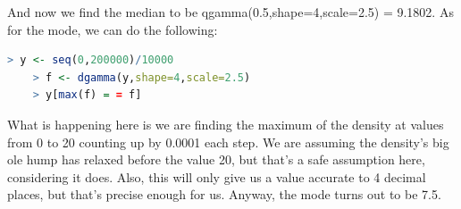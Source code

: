 \documentclass{scrartcl}
\begin{document}
\begin{enumerate}
  And now we find the median to be qgamma(0.5,shape=4,scale=2.5) = 9.1802. As for the mode, we can do the following:
  \begin{lstlisting}[language=R]
    > y <- seq(0,200000)/10000
    > f <- dgamma(y,shape=4,scale=2.5)
    > y[max(f) = = f]
  \end{lstlisting}
  What is happening here is we are finding the maximum of the density at values from 0 to 20 counting up by 0.0001 each step. We are assuming the density's big ole hump has relaxed before the value 20, but that's a safe assumption here, considering it does. Also, this will only give us a value accurate to 4 decimal places, but that's precise enough for us. Anyway, the mode turns out to be 7.5.











  




\end{enumerate}
\end{document}

